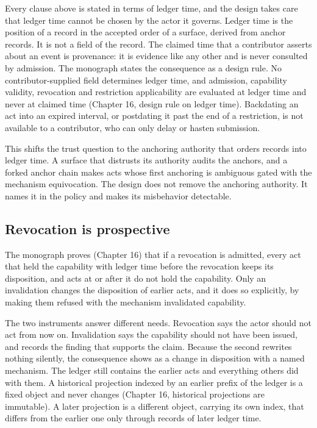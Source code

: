 \documentclass[11pt]{article}
\begin{document}
Every clause above is stated in terms of ledger time, and the design takes care that ledger time cannot be chosen by the actor it governs. Ledger time is the position of a record in the accepted order of a surface, derived from anchor records. It is not a field of the record. The claimed time that a contributor asserts about an event is provenance: it is evidence like any other and is never consulted by admission. The monograph states the consequence as a design rule. No contributor-supplied field determines ledger time, and admission, capability validity, revocation and restriction applicability are evaluated at ledger time and never at claimed time (Chapter 16, design rule on ledger time). Backdating an act into an expired interval, or postdating it past the end of a restriction, is not available to a contributor, who can only delay or hasten submission.

This shifts the trust question to the anchoring authority that orders records into ledger time. A surface that distrusts its authority audits the anchors, and a forked anchor chain makes acts whose first anchoring is ambiguous gated with the mechanism \textsf{equivocation}. The design does not remove the anchoring authority. It names it in the policy and makes its misbehavior detectable.

\subsection{Revocation is prospective}

The monograph proves (Chapter 16) that if a revocation is admitted, every act that held the capability with ledger time before the revocation keeps its disposition, and acts at or after it do not hold the capability. Only an invalidation changes the disposition of earlier acts, and it does so explicitly, by making them refused with the mechanism \textsf{invalidated capability}.

The two instruments answer different needs. Revocation says the actor should not act from now on. Invalidation says the capability should not have been issued, and records the finding that supports the claim. Because the second rewrites nothing silently, the consequence shows as a change in disposition with a named mechanism. The ledger still contains the earlier acts and everything others did with them. A historical projection indexed by an earlier prefix of the ledger is a fixed object and never changes (Chapter 16, historical projections are immutable). A later projection is a different object, carrying its own index, that differs from the earlier one only through records of later ledger time.
\end{document}
